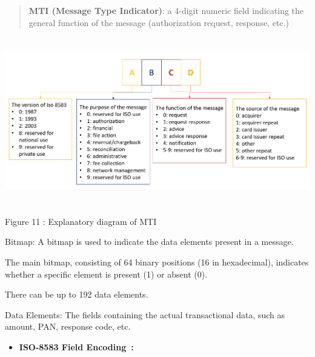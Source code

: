\documentclass[12pt,a4paper]{report}
\begin{document}
\begin{quote}
\textbf{MTI (Message Type Indicator)}: a 4-digit numeric field
indicating the general function of the message (authorization request,
response, etc.)
\end{quote}

\includegraphics[width=6.35065in,height=2.87582in]{vertopal_d1b0b2209edd4c6aa8254f57daa0953b/media/image30.png}

\protect\hypertarget{_Toc201954487}{}{}Figure 11 : Explanatory diagram
of MTI

Bitmap: A bitmap is used to indicate the data elements present in a
message.

The main bitmap, consisting of 64 binary positions (16 in hexadecimal),
indicates whether a specific element is present (1) or absent (0).

There can be up to 192 data elements.

Data Elements: The fields containing the actual transactional data, such
as amount, PAN, response code, etc.

\begin{itemize}
\item
  \textbf{ISO-8583 Field Encoding~:}
\end{itemize}
\end{document}
